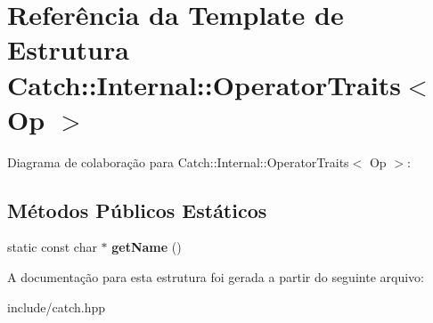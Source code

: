 \hypertarget{structCatch_1_1Internal_1_1OperatorTraits}{}\section{Referência da Template de Estrutura Catch\+:\+:Internal\+:\+:Operator\+Traits$<$ Op $>$}
\label{structCatch_1_1Internal_1_1OperatorTraits}


Diagrama de colaboração para Catch\+:\+:Internal\+:\+:Operator\+Traits$<$ Op $>$\+:
\subsection*{Métodos Públicos Estáticos}
\begin{DoxyCompactItemize}
\item 
static const char $\ast$ {\bfseries get\+Name} ()\hypertarget{structCatch_1_1Internal_1_1OperatorTraits_ac6d08082ea33348d42bc4ccbd6d07671}{}\label{structCatch_1_1Internal_1_1OperatorTraits_ac6d08082ea33348d42bc4ccbd6d07671}

\end{DoxyCompactItemize}


A documentação para esta estrutura foi gerada a partir do seguinte arquivo\+:\begin{DoxyCompactItemize}
\item 
include/catch.\+hpp\end{DoxyCompactItemize}
